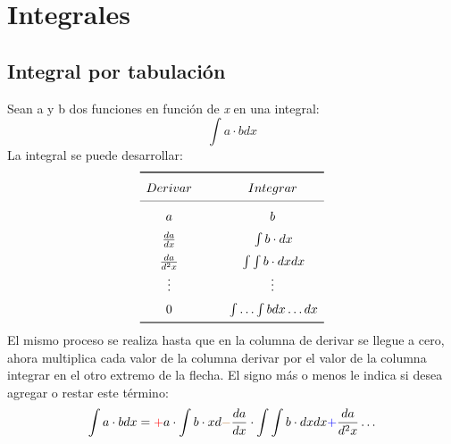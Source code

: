 \documentclass[11pt,fleqn]{book} %
\begin{document}
\section{Integrales}
\subsection{Integral por tabulación}
Sean a y b dos funciones en función de \textit{x} en una integral:
\begin{displaymath}
\int a\cdot b dx
\end{displaymath}
La integral se puede desarrollar:
\[
    \renewcommand{\arraystretch}{1.5}
    \begin{array}{c @{\hspace*{1.0cm}} c}\toprule
       Derivar & Integrar \\\cmidrule{1-2}
      a\tikzmark{Left 1} & \tikzmark{Right 1}b \\
      \frac{da}{dx} \tikzmark{Left 2} & \tikzmark{Right 2}\int b\cdot dx \\      
      \frac{da}{d^2x}  \tikzmark{Left 3} & \tikzmark{Right 3}\int\int b\cdot dx dx \\      
      \vdots  \tikzmark{Left 4} & \tikzmark{Right 4}\vdots \\
      0  \tikzmark{Left 5} & \tikzmark{Right 5}\int\ldots\int b dx\ldots dx \\
      \bottomrule
    \end{array}
\]
%
%
%
%
El mismo proceso se realiza hasta que en la columna de derivar se llegue a cero, ahora multiplica cada valor de la columna derivar por el valor de la columna integrar en el otro extremo de la flecha. El signo más o menos le indica si desea agregar o restar este término:
\begin{equation}
\label{art:integral pr tabulacion}
\int a\cdot b dx=\textcolor{red}+a\cdot\int b\cdot xd \textcolor{brown}{-}\frac{da}{dx}\cdot\int\int b\cdot dx dx\textcolor{blue}{+}\frac{da}{d^2x}\ldots
\end{equation}
\end{document}
